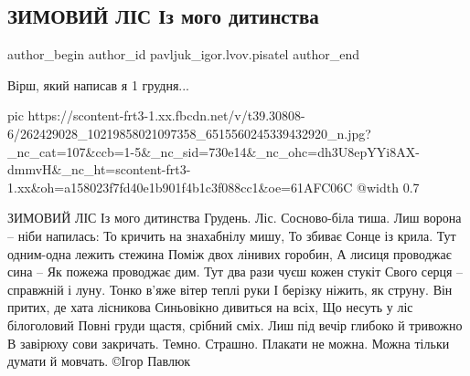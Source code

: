  
 
 
 
 
 
\subsection{ЗИМОВИЙ ЛІС Із мого дитинства}
\label{sec:01_12_2021.fb.pavljuk_igor.lvov.pisatel.1.zimovyj_lis_dytynstvo}
 
\ifcmt
 author_begin
   author_id pavljuk_igor.lvov.pisatel
 author_end
\fi

Вірш, який написав я 1 грудня...

\ifcmt
  pic https://scontent-frt3-1.xx.fbcdn.net/v/t39.30808-6/262429028_10219858021097358_6515560245339432920_n.jpg?_nc_cat=107&ccb=1-5&_nc_sid=730e14&_nc_ohc=dh3U8epYYi8AX-dmmvH&_nc_ht=scontent-frt3-1.xx&oh=a158023f7fd40e1b901f4b1c3f088cc1&oe=61AFC06C
  @width 0.7
\fi

\begin{multicols}{2}
\obeycr\noindent
ЗИМОВИЙ ЛІС
Із мого дитинства
\smallskip
Грудень. 
\smallskip
Ліс. 
\smallskip
Сосново-біла тиша.
Лиш ворона – ніби напилась:
То кричить на знахабнілу мишу,
То збиває Сонце із крила.
Тут одним-одна лежить стежина
Поміж двох лінивих горобин,
А лисиця проводжає сина –
Як пожежа проводжає дим.
Тут два рази чуєш кожен стукіт
Свого серця – справжній і луну.
Тонко в’яже вітер теплі руки
І берізку ніжить, як струну.
Він притих, де хата лісникова
Синьовікно дивиться на всіх,
Що несуть у ліс білоголовий
Повні груди щастя, срібний сміх.
Лиш під вечір глибоко й тривожно
В завірюху сови закричать.
Темно. 
Страшно.
Плакати не можна.
Можна тільки думати й мовчать.
\smallskip
©Ігор Павлюк
\restorecr
\end{multicols}

